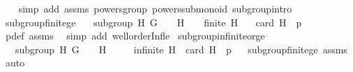 \begin{isabellebody}
%
\isadelimproof
\ \ %
\endisadelimproof
%
\isatagproof
{}\isamarkupfalse%
\ {\isacharparenleft}{\kern0pt}simp\ add{\isacharcolon}{\kern0pt}\ assms\ powers{\isacharunderscore}{\kern0pt}group\ powers{\isacharunderscore}{\kern0pt}submonoid\ subgroup{\isachardot}{\kern0pt}intro{\isacharparenright}{\kern0pt}%
\endisatagproof
{\isafoldproof}%
%
\isadelimproof
\isanewline
%
\endisadelimproof
\isanewline
{}\isamarkupfalse%
\ subgroup{\isacharunderscore}{\kern0pt}finite{\isacharunderscore}{\kern0pt}ge{\isacharcolon}{\kern0pt}\isanewline
\ \ \ {\isachardoublequoteopen}subgroup\ H\ G\ {\isacharparenleft}{\kern0pt}{\isasymcdot}{\isacharparenright}{\kern0pt}\ {\isasymone}{\isachardoublequoteclose}\ \ {\isachardoublequoteopen}H\ {\isasymnoteq}\ {\isacharbraceleft}{\kern0pt}{\isasymone}{\isacharbraceright}{\kern0pt}{\isachardoublequoteclose}\ \ {\isachardoublequoteopen}finite\ H{\isachardoublequoteclose}\isanewline
\ \ \ {\isachardoublequoteopen}card\ H\ {\isasymge}\ p{\isachardoublequoteclose}\isanewline
%
\isadelimproof
\ \ %
\endisadelimproof
%
\isatagproof
{}\isamarkupfalse%
\ p{\isacharunderscore}{\kern0pt}def\ assms\ \isamarkupfalse%
\ {\isacharparenleft}{\kern0pt}simp\ add{\isacharcolon}{\kern0pt}\ wellorder{\isacharunderscore}{\kern0pt}Inf{\isacharunderscore}{\kern0pt}le{}{\isacharparenright}{\kern0pt}%
\endisatagproof
{\isafoldproof}%
%
\isadelimproof
\isanewline
%
\endisadelimproof
\isanewline
{}\isamarkupfalse%
\ subgroup{\isacharunderscore}{\kern0pt}infinite{\isacharunderscore}{\kern0pt}or{\isacharunderscore}{\kern0pt}ge{\isacharcolon}{\kern0pt}\isanewline
\ \ \ {\isachardoublequoteopen}subgroup\ H\ G\ {\isacharparenleft}{\kern0pt}{\isasymcdot}{\isacharparenright}{\kern0pt}\ {\isasymone}{\isachardoublequoteclose}\ \ {\isachardoublequoteopen}H\ {\isasymnoteq}\ {\isacharbraceleft}{\kern0pt}{\isasymone}{\isacharbraceright}{\kern0pt}{\isachardoublequoteclose}\isanewline
\ \ \ {\isachardoublequoteopen}infinite\ H\ {\isasymor}\ card\ H\ {\isasymge}\ p{\isachardoublequoteclose}%
\isadelimproof
\ %
\endisadelimproof
%
\isatagproof
{}\isamarkupfalse%
\ subgroup{\isacharunderscore}{\kern0pt}finite{\isacharunderscore}{\kern0pt}ge\ assms\ \isamarkupfalse%
\ auto%
\endisatagproof
{\isafoldproof}%
%
\isadelimproof
%
\endisadelimproof
\isanewline
\isanewline
{}\isamarkupfalse%
%
\isadelimdocument
%
\endisadelimdocument

\end{isabellebody}
